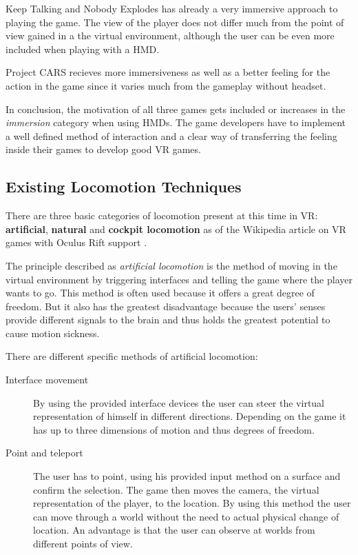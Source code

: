 Keep Talking and Nobody Explodes has already a very immersive approach to playing the game. The view of the player does not differ much from the point of view gained in a the virtual environment, although the user can be even more included when playing with a HMD.

Project CARS recieves more immersiveness as well as a better feeling for the action in the game since it varies much from the gameplay without headset. 

In conclusion, the motivation of all three games gets included or increases in the \textit{immersion} category when using HMDs. The game developers have to implement a well defined method of interaction and a clear way of transferring the feeling inside their games to develop good VR games. 

\subsection{Existing Locomotion Techniques}
\label{sec:exLocomotion}

There are three basic categories of locomotion present at this time in VR: 
\textbf{artificial}, \textbf{natural} and \textbf{cockpit locomotion} as of the Wikipedia article on VR games with Oculus Rift support \cite{wiki:vrOculus}.

The principle described as \textit{artificial locomotion} is the method of 
moving in the virtual environment by triggering interfaces and telling the game 
where the player wants to go. This method is often used because it offers a great 
degree of freedom. But it also has the greatest disadvantage because the users' 
senses provide different signals to the brain and thus holds the greatest 
potential to cause motion sickness.

There are different specific methods of artificial locomotion:
\begin{description}
	\item[Interface movement]By using the provided interface devices the user 
	can steer the virtual representation of himself in different directions. 
	Depending on the game it has up to three dimensions of motion and thus 
	degrees of freedom.
	\item[Point and teleport]The user has to point, using his provided input 
	method on a surface and confirm the selection. The 
	game then moves the camera, the virtual representation of the player, to the 
	location. By using this method the user can move through a world without 
	the need to actual physical change of location. An advantage is that 
	the user can observe at worlds from different points of view.
\end{description}


